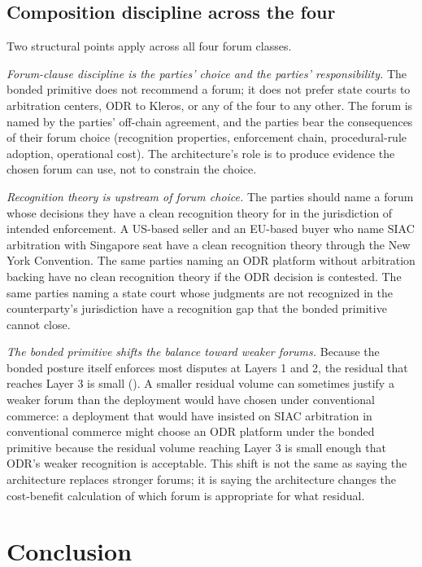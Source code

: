 \documentclass[11pt,a4paper]{article}
\theoremstyle{remark}
\begin{document}
\subsection{Composition discipline across the four}

Two structural points apply across all four forum classes.

\emph{Forum-clause discipline is the parties' choice and the
parties' responsibility.} The bonded primitive does not
recommend a forum; it does not prefer state courts to arbitration
centers, ODR to Kleros, or any of the four to any other. The
forum is named by the parties' off-chain agreement, and the
parties bear the consequences of their forum choice (recognition
properties, enforcement chain, procedural-rule adoption,
operational cost). The architecture's role is to produce
evidence the chosen forum can use, not to constrain the choice.

\emph{Recognition theory is upstream of forum choice.} The
parties should name a forum whose decisions they have a clean
recognition theory for in the jurisdiction of intended
enforcement. A US-based seller and an EU-based buyer who name
SIAC arbitration with Singapore seat have a clean recognition
theory through the New York Convention. The same parties naming
an ODR platform without arbitration backing have no clean
recognition theory if the ODR decision is contested. The same
parties naming a state court whose judgments are not recognized
in the counterparty's jurisdiction have a recognition gap that
the bonded primitive cannot close.

\emph{The bonded primitive shifts the balance toward weaker
forums.} Because the bonded posture itself enforces most
disputes at Layers 1 and 2, the residual that reaches Layer 3
is small (). A smaller residual
volume can sometimes justify a weaker forum than the deployment
would have chosen under conventional commerce: a deployment that
would have insisted on SIAC arbitration in conventional commerce
might choose an ODR platform under the bonded primitive because
the residual volume reaching Layer 3 is small enough that ODR's
weaker recognition is acceptable. This shift is not the same as
saying the architecture replaces stronger forums; it is saying
the architecture changes the cost-benefit calculation of which
forum is appropriate for what residual.

\section{Conclusion}
\label{sec:conclusion}
\end{document}
